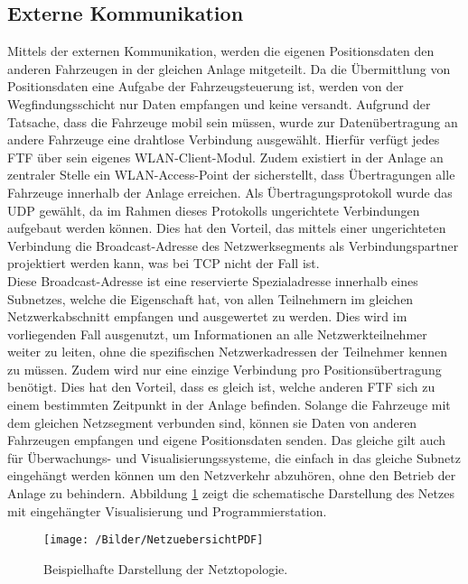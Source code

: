 	\subsection{Externe Kommunikation}
		\label{Externe Kommunikation}
		Mittels der externen Kommunikation, werden die eigenen Positionsdaten den anderen Fahrzeugen in der gleichen Anlage mitgeteilt. Da die Übermittlung von Positionsdaten eine Aufgabe der Fahrzeugsteuerung ist, werden von der Wegfindungsschicht nur Daten empfangen und keine versandt. Aufgrund der Tatsache, dass die Fahrzeuge mobil sein müssen, wurde zur Datenübertragung an andere Fahrzeuge eine drahtlose Verbindung ausgewählt. Hierfür verfügt jedes \ac{FTF} über sein eigenes \acs{WLAN}-Client-Modul. Zudem existiert in der Anlage an zentraler Stelle ein \acs{WLAN}-Access-Point der sicherstellt, dass Übertragungen alle Fahrzeuge innerhalb der Anlage erreichen. Als Übertragungsprotokoll wurde das \ac{UDP} gewählt, da im Rahmen dieses Protokolls ungerichtete Verbindungen aufgebaut werden können. Dies hat den Vorteil, das mittels einer ungerichteten Verbindung die Broadcast-Adresse des Netzwerksegments als Verbindungspartner projektiert werden kann, was bei \ac{TCP} nicht der Fall ist. 
		\\[4pt]
		Diese Broadcast-Adresse ist eine reservierte Spezialadresse innerhalb eines Subnetzes, welche die Eigenschaft hat, von allen Teilnehmern im gleichen Netzwerkabschnitt empfangen und ausgewertet zu werden. Dies wird im vorliegenden Fall ausgenutzt, um Informationen an alle Netzwerkteilnehmer weiter zu leiten, ohne die spezifischen Netzwerkadressen der Teilnehmer kennen zu müssen. Zudem wird nur eine einzige Verbindung pro Positionsübertragung benötigt. Dies hat den Vorteil, dass es gleich ist, welche anderen \ac{FTF} sich zu einem bestimmten Zeitpunkt in der Anlage befinden. Solange die Fahrzeuge mit dem gleichen Netzsegment verbunden sind, können sie Daten von anderen Fahrzeugen empfangen und eigene Positionsdaten senden. Das gleiche gilt auch für Überwachungs- und Visualisierungssysteme, die einfach in das gleiche Subnetz eingehängt werden können um den Netzverkehr abzuhören, ohne den Betrieb der Anlage zu behindern. Abbildung \ref{Netzuebersicht} zeigt die schematische Darstellung des Netzes mit eingehängter Visualisierung und Programmierstation.
		\\
		\begin{figure}
			\centering
			\texttt{[image: /Bilder/NetzuebersichtPDF]}
			\vspace{0.2cm}
			\caption{Beispielhafte Darstellung der Netztopologie.}\label{Netzuebersicht}
		\end{figure}
